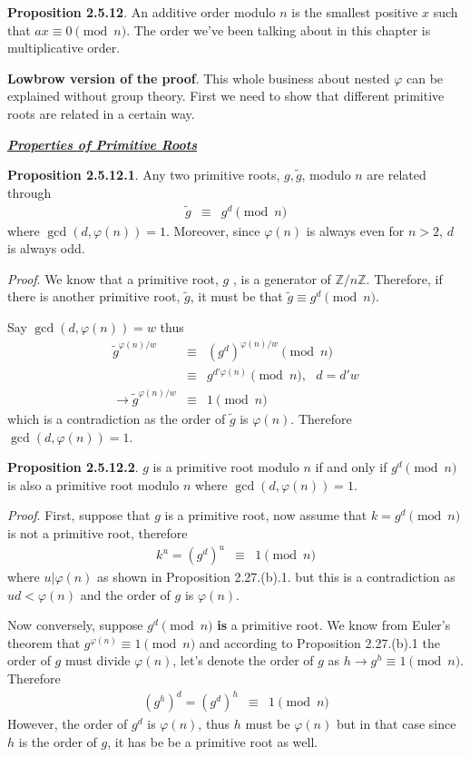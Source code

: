 \documentclass[aps,preprint,preprintnumbers,nofootinbib,showpacs,prd]{revtex4-1}
\newcommand{\nbea}{\begin{eqnarray*}}
\newcommand{\neea}{\end{eqnarray*}}
\begin{document}
{\bf Proposition 2.5.12}. An additive order modulo $n$ is the smallest positive $x$ such that $ax \equiv 0 \pmod{n}$. The order we've been talking about in this chapter is multiplicative order.

{\bf Lowbrow version of the proof}. This whole business about nested $\varphi$ can be explained without group theory. First we need to show that different primitive roots are related in a certain way.

\bigskip
\underline{\textbf{\textit{Properties of Primitive Roots}}}
\bigskip

{\bf Proposition 2.5.12.1}. Any two primitive roots, $g, \tilde g$, modulo $n$ are related through
%
\nbea
\tilde g & \equiv & g^{d} \pmod{n}
\neea
%
where $\gcd(d, \varphi(n)) = 1$. Moreover, since $\varphi(n)$ is always even for $n > 2$, $d$ is always odd.

{\it Proof}. We know that a primitive root, $g$ , is a generator of $\mathbb{Z}/n\mathbb{Z}$. Therefore, if there is another primitive root, $\tilde g$, it must be that $\tilde g \equiv g^d \pmod{n}$.

Say $\gcd(d, \varphi(n)) = w$ thus
%
\nbea
\tilde g^{\varphi(n)/w} & \equiv & (g^{d})^{\varphi(n)/w} \pmod{n} \\
& \equiv & g^{d'\varphi(n)} \pmod{n}, ~~~ d = d'w\\
\to \tilde g^{\varphi(n)/w} & \equiv & 1 \pmod{n}
\neea
%
which is a contradiction as the order of $\tilde g$ is $\varphi(n)$. Therefore $\gcd(d, \varphi(n)) = 1$.

{\bf Proposition 2.5.12.2}. $g$ is a primitive root modulo $n$ if and only if $g^d \pmod{n}$ is also a primitive root modulo $n$ where $\gcd(d,\varphi(n)) = 1$.

{\it Proof}. First, suppose that $g$ is a primitive root, now assume that $k = g^d \pmod{n}$ is not a primitive root, therefore
%
\nbea
k^u = (g^d)^u & \equiv & 1 \pmod{n}
\neea
%
where $u|\varphi(n)$ as shown in Proposition 2.27.(b).1. but this is a contradiction as $ud < \varphi(n)$ and the order of $g$ is $\varphi(n)$.

Now conversely, suppose $g^d \pmod{n}$ {\bf is} a primitive root. We know from Euler's theorem that $g^{\varphi(n)} \equiv 1 \pmod{n}$ and according to Proposition 2.27.(b).1 the order of $g$ must divide $\varphi(n)$, let's denote the order of $g$ as $h \to g^h \equiv 1 \pmod{n}$. Therefore
%
\nbea
(g^{h})^d = (g^d)^h & \equiv & 1 \pmod{n}
\neea
%
However, the order of $g^d$ is $\varphi(n)$, thus $h$ must be $\varphi(n)$ but in that case since $h$ is the order of $g$, it has be be a primitive root as well.
\end{document}

